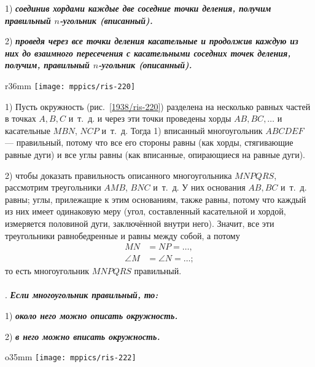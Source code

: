1) \textbf{\emph{соединив хордами каждые две соседние точки деления, получим правильный $n$-угольник (вписанный).}}

2) \textbf{\emph{проведя через все точки деления касательные и продолжив каждую из них до взаимного пересечения с касательными соседних точек деления, получим, правильный $n$-угольник (описанный).}}

\begin{wrapfigure}{r}{36mm}
\centering
\texttt{[image: mppics/ris-220]}
\caption{}\label{1938/ris-220}
\end{wrapfigure}

1) Пусть окружность (рис.~\ref{1938/ris-220}) разделена на несколько равных частей в точках $A, B, C$ и~т.~д.
и через эти точки проведены хорды $AB, BC,\dots$
и касательные $MBN$, $NCP$ и~т.~д.
Тогда 1) вписанный многоугольник $ABCDEF$ — правильный, потому что все его стороны равны (как хорды, стягивающие равные дуги) и все углы равны (как вписанные, опирающиеся на равные дуги).

2) чтобы доказать правильность описанного многоугольника $MNPQRS$, рассмотрим треугольники $AMB$, $BNC$ и~т.~д.
У них основания $AB, BC$ и~т.~д.
равны;
углы, прилежащие к этим основаниям, также равны, потому что каждый из них имеет одинаковую меру (угол, составленный касательной и хордой, измеряется половиной дуги, заключённой внутри него).
Значит, все эти треугольники равнобедренные и равны между собой, а потому 
\begin{align*}
MN&=NP=\dots,
\\
\angle M&=\angle N=\dots;
\end{align*}
то есть многоугольник $MNPQRS$ правильный.

\paragraph{}\label{1938/215}
.
\textbf{\emph{Если многоугольник правильный, то:}}

1) \textbf{\emph{около него можно описать окружность.}}

2) \textbf{\emph{в него можно вписать окружность.}}

\begin{wrapfigure}{o}{35mm}
\centering
\texttt{[image: mppics/ris-222]}
\caption{}\label{1938/ris-222}
\end{wrapfigure}

